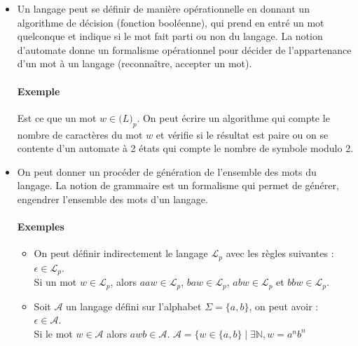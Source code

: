 \begin{itemize}
	\item Un langage peut se définir de manière opérationnelle en donnant un algorithme de décision (fonction booléenne), qui prend en entré un mot quelconque et indique si le mot fait parti ou non du langage. La notion d'automate donne un formalisme opérationnel pour décider de l'appartenance d'un mot à un langage (reconnaître, accepter un mot).

	\paragraph{Exemple} %
	\label{par:exemple}

	Est ce que un mot $w \in \mathcal(L)_p$. On peut écrire un algorithme qui compte le nombre de caractères du mot $w$ et vérifie si le résultat est paire ou on se contente d'un automate à 2 états qui compte le nombre de symbole modulo 2.\\
	


	\item On peut donner un procéder de génération de l'ensemble des mots du langage. La notion de grammaire est un formalisme qui permet de générer, engendrer l'ensemble des mots d'un langage.\\

	\paragraph{Exemples} %
	\label{par:exemples}

	\begin{itemize}
		\item On peut définir indirectement le langage $\mathcal{L}_p$ avec les règles suivantes :\\
		$\epsilon \in \mathcal{L}_p$.\\
		Si un mot $w \in \mathcal{L}_p$, alors $aaw \in \mathcal{L}_p$, $baw \in \mathcal{L}_p$, $abw \in \mathcal{L}_p$ et $bbw \in \mathcal{L}_p$.

		\item Soit $\mathcal{A}$ un langage défini sur l'alphabet $\Sigma = \{a,b\}$, on peut avoir :\\
		$\epsilon \in \mathcal{A}$.\\
		Si le mot $w \in \mathcal{A}$ alors $awb \in \mathcal{A}$.
		$\mathcal{A} = \{w \in \{a,b\} \mid \exists \mathbb{N}, w=a^nb^n$
	\end{itemize}



\end{itemize}

